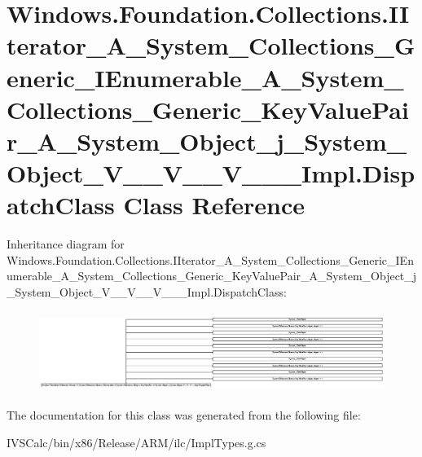 \hypertarget{class_windows_1_1_foundation_1_1_collections_1_1_i_iterator___a___system___collections___generic42ad9a675357d7bd4bbbdaa6b5a120e8}{}\section{Windows.\+Foundation.\+Collections.\+I\+Iterator\+\_\+\+A\+\_\+\+System\+\_\+\+Collections\+\_\+\+Generic\+\_\+\+I\+Enumerable\+\_\+\+A\+\_\+\+System\+\_\+\+Collections\+\_\+\+Generic\+\_\+\+Key\+Value\+Pair\+\_\+\+A\+\_\+\+System\+\_\+\+Object\+\_\+j\+\_\+\+System\+\_\+\+Object\+\_\+\+V\+\_\+\+\_\+\+V\+\_\+\+\_\+\+V\+\_\+\+\_\+\+\_\+\+Impl.\+Dispatch\+Class Class Reference}
\label{class_windows_1_1_foundation_1_1_collections_1_1_i_iterator___a___system___collections___generic42ad9a675357d7bd4bbbdaa6b5a120e8}
Inheritance diagram for Windows.\+Foundation.\+Collections.\+I\+Iterator\+\_\+\+A\+\_\+\+System\+\_\+\+Collections\+\_\+\+Generic\+\_\+\+I\+Enumerable\+\_\+\+A\+\_\+\+System\+\_\+\+Collections\+\_\+\+Generic\+\_\+\+Key\+Value\+Pair\+\_\+\+A\+\_\+\+System\+\_\+\+Object\+\_\+j\+\_\+\+System\+\_\+\+Object\+\_\+\+V\+\_\+\+\_\+\+V\+\_\+\+\_\+\+V\+\_\+\+\_\+\+\_\+\+Impl.\+Dispatch\+Class\+:\begin{figure}[H]
\begin{center}
\leavevmode
\includegraphics[height=2.616822cm]{class_windows_1_1_foundation_1_1_collections_1_1_i_iterator___a___system___collections___generic42ad9a675357d7bd4bbbdaa6b5a120e8}
\end{center}
\end{figure}


The documentation for this class was generated from the following file\+:\begin{DoxyCompactItemize}
\item 
I\+V\+S\+Calc/bin/x86/\+Release/\+A\+R\+M/ilc/Impl\+Types.\+g.\+cs\end{DoxyCompactItemize}
